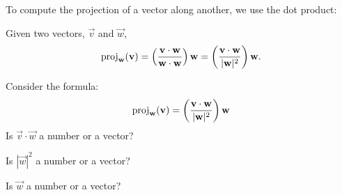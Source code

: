 \documentclass{ximera}
\begin{document}
To compute the projection of a vector along another, we use the dot
product:

\begin{theorem}
  Given two vectors, $\vec{v}$ and $\vec{w}$,
  \[
  \operatorname{proj}_\mathbf{w}(\mathbf{v}) =\left(\frac{\mathbf{v} \cdot \mathbf{w}}{\mathbf{w}\cdot \mathbf{w}}\right) \mathbf{w}=\left(\frac{\mathbf{v} \cdot \mathbf{w}}{|\mathbf{w}|^2}\right) \mathbf{w}.
  \]
\end{theorem}

\begin{question}
  Consider the formula:
  \[
  \operatorname{proj}_\mathbf{w}(\mathbf{v}) =\left(\frac{\mathbf{v} \cdot \mathbf{w}}{|\mathbf{w}|^2}\right) \mathbf{w}
  \]
  Is $\vec{v}\cdot \vec{w}$ a number or a vector?
  \begin{prompt}
  \begin{multipleChoice}
  \end{multipleChoice}
  \end{prompt}
  \begin{question}
    Is $|\vec{w}|^2$ a number or a vector?
     \begin{prompt}
    \begin{multipleChoice}  
      \end{multipleChoice}
     \end{prompt}
    \begin{question}
      Is $\vec{w}$ a number or a vector?
      \begin{prompt}
        \begin{multipleChoice}
        \end{multipleChoice}
      \end{prompt}
    \end{question}
  \end{question}
\end{question}
\end{document}
